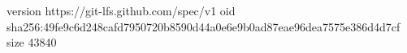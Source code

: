 version https://git-lfs.github.com/spec/v1
oid sha256:49fe9c6d248cafd7950720b8590d44a0e6e9b0ad87eae96dea7575e386d4d7cf
size 43840
